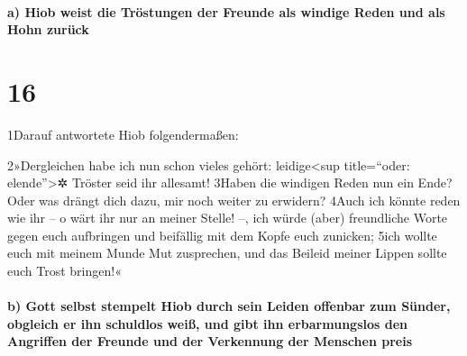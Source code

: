 \hypertarget{a-hiob-weist-die-truxf6stungen-der-freunde-als-windige-reden-und-als-hohn-zuruxfcck}{%
\paragraph{a) Hiob weist die Tröstungen der Freunde als windige Reden
und als Hohn
zurück}\label{a-hiob-weist-die-truxf6stungen-der-freunde-als-windige-reden-und-als-hohn-zuruxfcck}}

\hypertarget{section-15}{%
\section{16}\label{section-15}}

1Darauf antwortete Hiob folgendermaßen:

2»Dergleichen habe ich nun schon vieles gehört: leidige\textless sup
title=``oder: elende''\textgreater✲ Tröster seid ihr allesamt! 3Haben
die windigen Reden nun ein Ende? Oder was drängt dich dazu, mir noch
weiter zu erwidern? 4Auch ich könnte reden wie ihr -- o wärt ihr nur an
meiner Stelle! --, ich würde (aber) freundliche Worte gegen euch
aufbringen und beifällig mit dem Kopfe euch zunicken; 5ich wollte euch
mit meinem Munde Mut zusprechen, und das Beileid meiner Lippen sollte
euch Trost bringen!«

\hypertarget{b-gott-selbst-stempelt-hiob-durch-sein-leiden-offenbar-zum-suxfcnder-obgleich-er-ihn-schuldlos-weiuxdf-und-gibt-ihn-erbarmungslos-den-angriffen-der-freunde-und-der-verkennung-der-menschen-preis}{%
\paragraph{b) Gott selbst stempelt Hiob durch sein Leiden offenbar zum
Sünder, obgleich er ihn schuldlos weiß, und gibt ihn erbarmungslos den
Angriffen der Freunde und der Verkennung der Menschen
preis}\label{b-gott-selbst-stempelt-hiob-durch-sein-leiden-offenbar-zum-suxfcnder-obgleich-er-ihn-schuldlos-weiuxdf-und-gibt-ihn-erbarmungslos-den-angriffen-der-freunde-und-der-verkennung-der-menschen-preis}}

